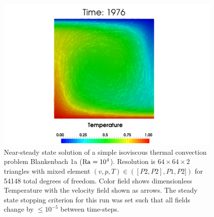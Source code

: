 \begin{figure}[htbp!]
  \centering
  \includegraphics[width=.9\textwidth]{figures/convection_isoviscous_TV.png}
  \caption{Near-steady state solution of a simple isoviscous thermal
    convection problem Blankenbach 1a
    \cite{blankenbach_benchmark_1989} ($\mathrm{Ra}=10^{4}$). Resolution is
    $64\times64\times2$ triangles with mixed element
    $(v,p,T)\in([P2,P2],P1,P2])$ for 54148 total degrees of freedom.  Color field
    shows dimensionless Temperature with the velocity field shown as
    arrows. The steady state stopping criterion for this run was set
    such that all fields change by $\leq10^{-5}$ between time-steps.}
  \label{fig:convection1a}
\end{figure}

\pagebreak{}

